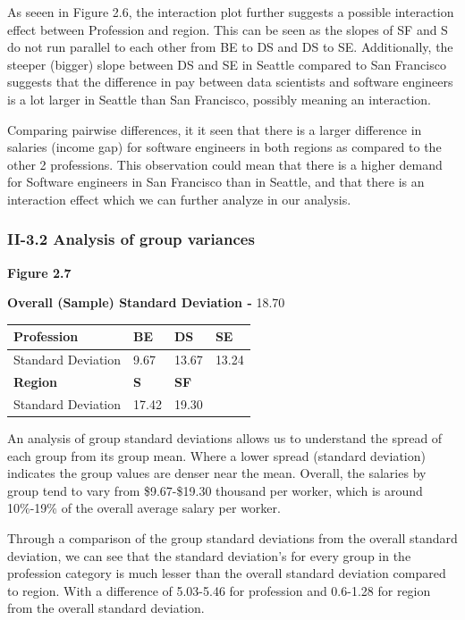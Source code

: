 \documentclass[
]{article}
\begin{document}
As seeen in Figure 2.6, the interaction plot further suggests a possible
interaction effect between Profession and region. This can be seen as
the slopes of SF and S do not run parallel to each other from BE to DS
and DS to SE. Additionally, the steeper (bigger) slope between DS and SE
in Seattle compared to San Francisco suggests that the difference in pay
between data scientists and software engineers is a lot larger in
Seattle than San Francisco, possibly meaning an interaction.

Comparing pairwise differences, it it seen that there is a larger
difference in salaries (income gap) for software engineers in both
regions as compared to the other 2 professions. This observation could
mean that there is a higher demand for Software engineers in San
Francisco than in Seattle, and that there is an interaction effect which
we can further analyze in our analysis.

\subsubsection{II-3.2 Analysis of group
variances}\label{ii-3.2-analysis-of-group-variances}

\textbf{Figure 2.7}

\textbf{Overall (Sample) Standard Deviation -} 18.70

\begin{longtable}[]{@{}llll@{}}
\toprule\noalign{}
\textbf{Profession} & \textbf{BE} & \textbf{DS} & \textbf{SE} \\
\midrule\noalign{}
\endhead
\bottomrule\noalign{}
\endlastfoot
Standard Deviation & 9.67 & 13.67 & 13.24 \\
\textbf{Region} & \textbf{S} & \textbf{SF} & \\
Standard Deviation & 17.42 & 19.30 & \\
\end{longtable}

An analysis of group standard deviations allows us to understand the
spread of each group from its group mean. Where a lower spread (standard
deviation) indicates the group values are denser near the mean. Overall,
the salaries by group tend to vary from \$9.67-\$19.30 thousand per
worker, which is around 10\%-19\% of the overall average salary per
worker.

Through a comparison of the group standard deviations from the overall
standard deviation, we can see that the standard deviation's for every
group in the profession category is much lesser than the overall
standard deviation compared to region. With a difference of 5.03-5.46
for profession and 0.6-1.28 for region from the overall standard
deviation.
\end{document}
